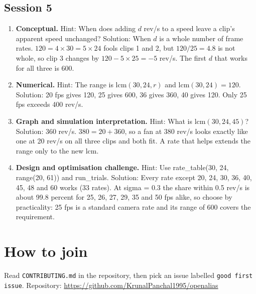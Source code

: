 \documentclass[11pt,a4paper]{article}
\begin{document}
\subsection*{Session 5}
\begin{enumerate}[nosep]
\item \textbf{Conceptual.} Hint: When does adding $d$ rev/s to a speed leave a clip's apparent speed unchanged? Solution: When $d$ is a whole number of frame rates. $120=4\times30=5\times24$ fools clips 1 and 2, but $120/25=4.8$ is not whole, so clip 3 changes by $120-5\times25=-5$ rev/s. The first $d$ that works for all three is 600.
\item \textbf{Numerical.} Hint: The range is $\mathrm{lcm}(30,24,r)$ and $\mathrm{lcm}(30,24)=120$. Solution: 20 fps gives 120, 25 gives 600, 36 gives 360, 40 gives 120. Only 25 fps exceeds 400 rev/s.
\item \textbf{Graph and simulation interpretation.} Hint: What is $\mathrm{lcm}(30,24,45)$? Solution: 360 rev/s. $380=20+360$, so a fan at 380 rev/s looks exactly like one at 20 rev/s on all three clips and both fit. A rate that helps extends the range only to the new lcm.
\item \textbf{Design and optimisation challenge.} Hint: Use rate\_table(30, 24, range(20, 61)) and run\_trials. Solution: Every rate except 20, 24, 30, 36, 40, 45, 48 and 60 works (33 rates). At sigma = 0.3 the share within 0.5 rev/s is about 99.8 percent for 25, 26, 27, 29, 35 and 50 fps alike, so choose by practicality: 25 fps is a standard camera rate and its range of 600 covers the requirement.
\end{enumerate}

\section{How to join}
Read \texttt{CONTRIBUTING.md} in the repository, then pick an issue labelled \texttt{good first issue}. Repository: \url{https://github.com/KrunalPanchal1995/openalias}
\end{document}

